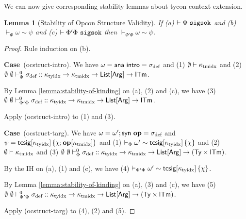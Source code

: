 \documentclass[12pt]{article}
\newtheorem{lemma}{Lemma}
\newcommand{\pfcase}[1]{\textbf{Case}~#1. }
\begin{document}
We can now give corresponding stability lemmas about tycon context extension.

\begin{lemma}[Stability of Opcon Structure Validity]
\label{lemma:stability-of-opcon-structure-validity}
If (a) $\vdash \Phi~\mathtt{sigsok}$ and (b) $\vdash_\Phi \omega \sim \psi$ and (c)  $\vdash \Phi'\Phi~\mathtt{sigsok}$ then $\vdash_{\Phi'\Phi} \omega \sim \psi$. 
\end{lemma}
\begin{proof} Rule induction on (b).

\pfcase{(ocstruct-intro)} We have $\omega={\sf ana}~{\sf intro}=\sigma_\text{def}$ and (1) $\emptyset \vdash \kappa_\text{tmidx}$ and (2) $
    \emptyset~\emptyset \vdash_{\Phi}^{0} \sigma_\text{def} :: \kappa_\text{tyidx} \rightarrow \kappa_\text{tmidx} \rightarrow {\sf List}[{\sf Arg}] \rightarrow {\sf ITm}$.

    By Lemma \ref{lemma:stability-of-kinding} on (a), (2) and (c), we have (3) $
    \emptyset~\emptyset \vdash_{\Phi'\Phi}^{0} \sigma_\text{def} :: \kappa_\text{tyidx} \rightarrow \kappa_\text{tmidx} \rightarrow {\sf List}[{\sf Arg}] \rightarrow {\sf ITm}$.

    Apply (ocstruct-intro) to (1) and (3).

\pfcase{(ocstruct-targ)} We have $\omega=\omega'; {\sf syn}~\textbf{op}=\sigma_\text{def}$ and $\psi={\sf tcsig}[\kappa_\text{tyidx}]\,\{\chi; \textbf{op}[\kappa_\text{tmidx}]\}$ and (1) $\vdash_\Phi \omega' \sim {\sf tcsig}[\kappa_\text{tyidx}]\,\{\chi\}$ and (2) $\emptyset \vdash \kappa_\text{tmidx}$ and (3) $\emptyset~\emptyset \vdash_{\Phi}^{0} \sigma_\text{def} :: \kappa_\text{tyidx} \rightarrow \kappa_\text{tmidx} \rightarrow {\sf List}[{\sf Arg}] \rightarrow ({\sf Ty} \times {\sf ITm})$.

By the IH on (a), (1) and (c), we have (4) $\vdash_{\Phi'\Phi} \omega' \sim {\sf tcsig}[\kappa_\text{tyidx}]\,\{\chi\}$.

By Lemma \ref{lemma:stability-of-kinding} on (a), (3) and (c), we have (5) $\emptyset~\emptyset \vdash_{\Phi'\Phi}^{0} \sigma_\text{def} :: \kappa_\text{tyidx} \rightarrow \kappa_\text{tmidx} \rightarrow {\sf List}[{\sf Arg}] \rightarrow ({\sf Ty} \times {\sf ITm})$.

Apply (ocstruct-targ) to (4), (2) and (5).
\end{proof}
\end{document}
